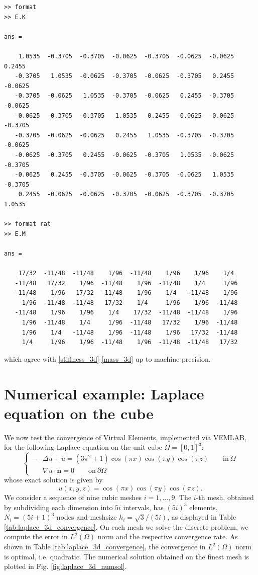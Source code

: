 \documentclass[a4paper]{article}
\begin{document}
\begin{lstlisting}
>> format
>> E.K

ans =

    1.0535  -0.3705  -0.3705  -0.0625  -0.3705  -0.0625  -0.0625   0.2455
   -0.3705   1.0535  -0.0625  -0.3705  -0.0625  -0.3705   0.2455  -0.0625
   -0.3705  -0.0625   1.0535  -0.3705  -0.0625   0.2455  -0.3705  -0.0625
   -0.0625  -0.3705  -0.3705   1.0535   0.2455  -0.0625  -0.0625  -0.3705
   -0.3705  -0.0625  -0.0625   0.2455   1.0535  -0.3705  -0.3705  -0.0625
   -0.0625  -0.3705   0.2455  -0.0625  -0.3705   1.0535  -0.0625  -0.3705
   -0.0625   0.2455  -0.3705  -0.0625  -0.3705  -0.0625   1.0535  -0.3705
    0.2455  -0.0625  -0.0625  -0.3705  -0.0625  -0.3705  -0.3705   1.0535
      
>> format rat
>> E.M

ans =

    17/32  -11/48  -11/48    1/96  -11/48    1/96    1/96    1/4
   -11/48   17/32    1/96  -11/48    1/96  -11/48    1/4     1/96
   -11/48    1/96   17/32  -11/48    1/96    1/4   -11/48    1/96    
     1/96  -11/48  -11/48   17/32    1/4     1/96    1/96  -11/48    
   -11/48    1/96    1/96    1/4    17/32  -11/48  -11/48    1/96    
     1/96  -11/48    1/4     1/96  -11/48   17/32    1/96  -11/48    
     1/96    1/4   -11/48    1/96  -11/48    1/96   17/32  -11/48    
     1/4     1/96    1/96  -11/48    1/96  -11/48  -11/48   17/32  
\end{lstlisting}

\noindent
which agree with \eqref{stiffness_3d}-\eqref{mass_3d} up to machine precision.


\section{Numerical example: Laplace equation on the cube}
We now test the convergence of Virtual Elements, implemented via VEMLAB,  for the following  Laplace equation on the unit cube $\Omega = [0,1]^3$:
\begin{equation}
\label{experiment_laplace_equation_3d}
\begin{cases}
-&\Delta u + u = (3\pi^2+1)\cos(\pi x)\cos(\pi y)\cos(\pi z) \qquad \text{in}\ \Omega\\
&\nabla u \cdot \boldsymbol{n} = 0 \qquad \text{on}\ \partial \Omega
\end{cases}
\end{equation}
whose exact solution  is given by
\begin{equation}
u(x,y,z) = \cos(\pi x)\cos(\pi y)\cos(\pi z).
\end{equation}
We consider a sequence of nine cubic meshes $i=1,\dots,9$. The $i$-th mesh, obtained by subdividing each dimension into $5i$ intervals,  has $(5i)^3$ elements, $N_i = (5i+1)^3$ nodes and meshsize $h_i = \sqrt{3}/(5i)$, as displayed in Table \ref{tab:laplace_3d_convergence}. On each mesh we solve the discrete problem,  we compute the error in $L^2(\Omega)$ norm and the respective convergence rate. As shown in Table \ref{tab:laplace_3d_convergence}, the convergence in $L^2(\Omega)$ norm is optimal, i.e. quadratic. The numerical solution obtained on the finest mesh is plotted in Fig.  \ref{fig:laplace_3d_numsol}.
\end{document}
